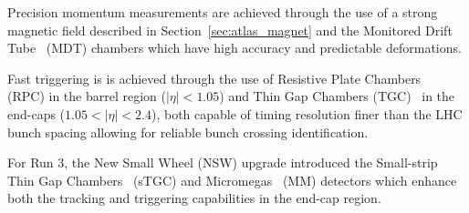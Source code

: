 Precision momentum measurements are achieved through the use of a strong magnetic field described in Section~\ref{sec:atlas_magnet} and the Monitored Drift Tube~\cite{atlas_mdt_paper} (MDT) chambers which have high accuracy and predictable deformations.

Fast triggering is is achieved through the use of Resistive Plate Chambers~\cite{atlas_run3_rpc_paper} (RPC) in the barrel region ($|\eta| < 1.05$) and Thin Gap Chambers (TGC)~\cite{atlas_tgc_paper} in the end-caps ($1.05 < |\eta| < 2.4$), both capable of timing resolution finer than the LHC bunch spacing allowing for reliable bunch crossing identification. 

For Run 3, the New Small Wheel (NSW) upgrade introduced the Small-strip Thin Gap Chambers~\cite{atlas_stgc_paper} (sTGC) and Micromegas~\cite{atlas_mm_paper} (MM) detectors which enhance both the tracking and triggering capabilities in the end-cap region.

